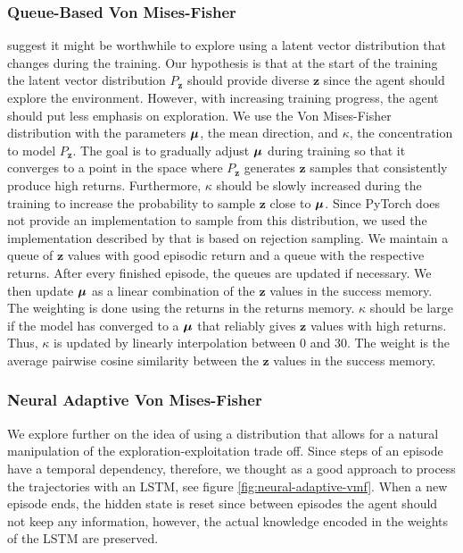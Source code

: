 \documentclass[10pt]{article} %
\begin{document}
\subsubsection{Queue-Based Von Mises-Fisher}
\cite{rle-paper} suggest it might be worthwhile to explore using a latent vector distribution that changes during the training. Our hypothesis is that at the start of the training the latent vector distribution $P_{\textbf{z}}$ should provide diverse $\textbf{z}$ since the agent should explore the environment. However, with increasing training progress, the agent should put less emphasis on exploration. We use the Von Mises-Fisher distribution with the parameters ${\bm{\mu}}$, the mean direction, and $\kappa$, the concentration to model $P_{\textbf{z}}$. The goal is to gradually adjust ${\bm{\mu}}$ during training so that it converges to a point in the space where $P_{\textbf{z}}$ generates $\mathbf{z}$ samples that consistently produce high returns. Furthermore, $\kappa$ should be slowly increased during the training to increase the probability to sample $\mathbf{z}$ close to ${\bm{\mu}}$. Since PyTorch does not provide an implementation to sample from this distribution, we used the implementation described by \cite{von-mises-fisher-paper} that is based on rejection sampling. We maintain a queue of $\textbf{z}$ values with good episodic return and a queue with the respective returns. After every finished episode, the queues are updated if necessary. We then update ${\bm{\mu}}$ as a linear combination of the $\textbf{z}$ values in the success memory. The weighting is done using the returns in the returns memory. $\kappa$ should be large if the model has converged to a ${\bm{\mu}}$ that reliably gives $\textbf{z}$ values with high returns. Thus, $\kappa$ is updated by linearly interpolation between 0 and 30. The weight is the average pairwise cosine similarity between the $\textbf{z}$ values in the success memory.


\subsubsection{Neural Adaptive Von Mises-Fisher}

We explore further on the idea of using a distribution that allows for a natural manipulation of the exploration-exploitation trade off. Since steps of an episode have a temporal dependency, therefore, we thought as a good approach to process the trajectories with an LSTM, see figure \ref{fig:neural-adaptive-vmf}. When a new episode ends, the hidden state is reset since between episodes the agent should not keep any information, however, the actual knowledge encoded in the weights of the LSTM are preserved. 
\end{document}

